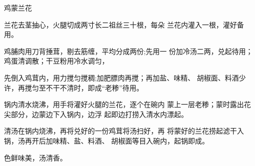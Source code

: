 \begin{recipe}{鸡蒙兰花}

\ingredients


\cooking

\step 兰花去茎抽心，火腿切成两寸长二祖丝三十根，每朵 兰花内灌入一根，灌好备用。

鸡脯肉用刀背捶茸，剔去筋缠，平均分成两份;先用一 份加冷汤二两，兑起待用；鸡蛋清调散；干豆粉用冷水调匀，

先倒入鸡茸内，用力搅匀搅稠;加肥膘肉再搅；再加盐、味精、 胡椒面、料酒少许，再搅匀至不干不清时，即成“老糁”待用。

锅内清水烧沸，用手将灌好火腿的兰花，逐个在碗内 蒙上一层老糁；蒙时露出花尖部分，边蒙边下入锅内，边浮 起即边打捞入清水内漂起。

\step 清汤在锅内烧沸，再将兑好的一份鸡茸将汤扫好，再 将蒙好的兰花捞起滤干入锅，汤再开后加味精、盐、料酒、 胡椒面等目入碗内，起锅即成。

\notes

色鲜味美，汤清香。

\end{recipe}

